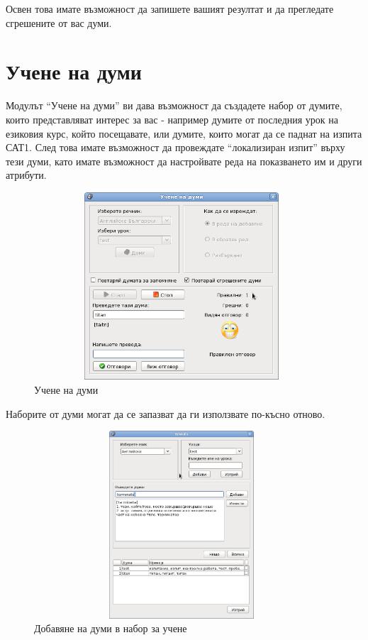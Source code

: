 Освен това имате възможност да запишете вашият резултат и да
прегледате сгрешените от вас думи. 
\section{Учене на думи}
Модулът "`Учене на думи"' ви дава възможност да създадете набор от
думите, които представляват интерес за вас - например думите от
последния урок на езиковия курс, който посещавате, или думите, които
могат да се паднат на изпита САТ1. След това имате възможност да
провеждате "`локализиран изпит"' върху тези думи, като имате
възможност да настройвате реда на показването им и други атрибути.

\begin{figure}[htbp]
  \caption{Учене на думи}
  \centering
  \includegraphics[width=110mm, height=70mm]{images/study_words.png}
\end{figure}

Наборите от думи могат да се запазват да ги използвате по-късно
отново.

\begin{figure}[htbp]
  \caption{Добавяне на думи в набор за учене}
  \centering
  \includegraphics[width=110mm, height=70mm]{images/add_to_study_set.png}
\end{figure}

